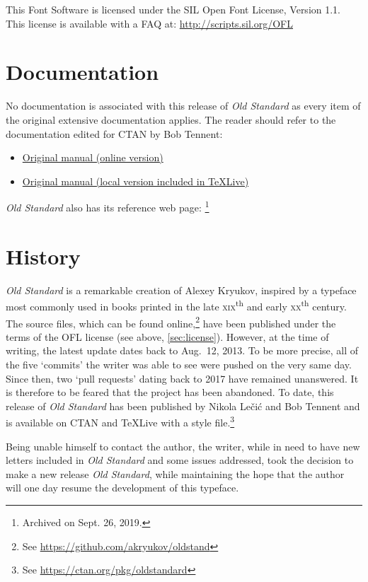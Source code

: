 This Font Software is licensed under the SIL Open Font License,
Version 1.1. This license is available with a FAQ at:
\url{http://scripts.sil.org/OFL}

\section{Documentation}
\label{sec:documentation}
No documentation is associated with this release of \emph{Old
  Standard} as every item of the original extensive documentation
applies. The reader should refer to the documentation edited for CTAN
by Bob Tennent:
\begin{itemize}
\item
  \href{http://mirrors.ctan.org/fonts/oldstandard/doc/oldstand-manual.pdf}%
  {Original manual (online version)}
\item \href{oldstand-manual.pdf}{Original manual (local version
    included in {\TeX}Live)}
\end{itemize}

\emph{Old Standard} also has its reference web page:
%
\footnote{Archived on Sept. 26, 2019.}

\section{History}
\label{sec:history}
\emph{Old Standard} is a remarkable creation of Alexey Kryukov,
inspired by a typeface most commonly used in books printed in the late
\textsc{xix}\textsuperscript{th} and early
\textsc{xx}\textsuperscript{th} century. The source files, which can
be found online,\footnote{See
  \url{https://github.com/akryukov/oldstand}} have been published
under the terms of the OFL license (see above,
\vref{sec:license}). However, at the time of writing, the latest
update dates back to Aug.\ 12, 2013. To be more precise, all of the
five \enquote*{commits} the writer was able to see were pushed on the
very same day. Since then, two \enquote*{pull requests} dating back to
2017 have remained unanswered. It is therefore to be feared that the
project has been abandoned.  To date, this release of \emph{Old
  Standard} has been published by Nikola Lečić and Bob Tennent and is
available on CTAN and {\TeX}Live with a style file.\footnote{See
  \url{https://ctan.org/pkg/oldstandard}}

Being unable himself to contact the author, the writer, while in need
to have new letters included in \emph{Old Standard} and some issues
addressed, took the decision to make a new release \emph{Old
  Standard}, while maintaining the hope that the author will one day
resume the development of this typeface.

